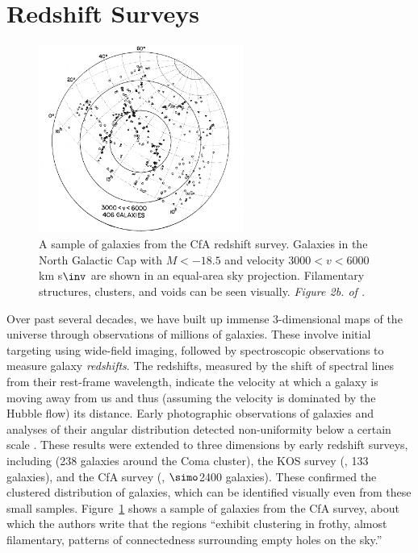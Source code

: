 \section{Redshift Surveys}

\begin{figure}
    \centering
    \includegraphics[width=0.6\textwidth]{cfa_survey}
    \caption{A sample of galaxies from the CfA redshift survey. Galaxies in the North Galactic Cap with $M<-18.5$ and velocity $3000<v<6000$ km s$\inv$ are shown in an equal-area sky projection. Filamentary structures, clusters, and voids can be seen visually. \emph{Figure 2b. of \cite{davis_survey_1982}.}}
    \label{fig:cfa_survey}
\end{figure}

Over past several decades, we have built up immense 3-dimensional maps of the universe through observations of millions of galaxies.
These involve initial targeting using wide-field imaging, followed by spectroscopic observations to measure galaxy \emph{redshifts}.
The redshifts, measured by the shift of spectral lines from their rest-frame wavelength, indicate the velocity at which a galaxy is moving away from us and thus (assuming the velocity is dominated by the Hubble flow) its distance.
Early photographic observations of galaxies and  analyses of their angular distribution detected non-uniformity below a certain scale \citep{shapley_survey_1932,hubble_distribution_1934,seldner_new_1977,peebles_galaxy_2001}.
These results were extended to three dimensions by early redshift surveys, including \cite{gregory_comaa1367_1978} (238 galaxies around the Coma cluster), the KOS survey (\citealt{kirshner_million_1981}, 133 galaxies), and the CfA survey (\citealt{davis_survey_1982}, $\simo$2400 galaxies).
These confirmed the clustered distribution of galaxies, which can be identified visually even from these small samples. 
Figure~\ref{fig:cfa_survey} shows a sample of galaxies from the CfA survey, about which the authors write that the regions ``exhibit clustering in frothy, almost filamentary, patterns of connectedness surrounding empty holes on the sky.''

